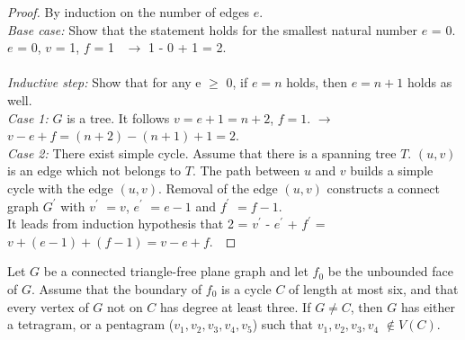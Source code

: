 \begin{proof}
By induction on the number of edges $e$.\\
\textit{Base case: } Show that the statement holds for the smallest natural number $e$ = 0.\\
$e$ = 0, $v$ = 1, $f$ = 1 \ $\xrightarrow{}$ 1 - 0 + 1 = 2. \\
\\
\textit{Inductive step: }Show that for any e $\geq$ 0, if $e = n$ holds, then $e = n + 1$ holds as well. \\
\textit{Case 1: }$G$ is a tree. It follows $v = e + 1 = n + 2$, $f = 1$. $\longrightarrow$ $v - e + f = (n + 2) - (n+1) + 1 = 2$.\\
\textit{Case 2: }There exist simple cycle. Assume that there is a spanning tree $T$. $(u, v)$ is an edge which not belongs to $T$. The path between $u$ and $v$ builds a simple cycle with the edge $(u, v)$. Removal of the edge $(u, v)$ constructs a connect graph $G^{'}$ with $v^{'}$ $ = v$, $e^{'}$ $=e - 1$ and $f^{'}$ $= f - 1$. \\
It leads from induction hypothesis that 2 = $v^{'}$ - $e^{'}$ + $f^{'}$ = $v + (e - 1) + (f - 1) = v - e + f$.\
\end{proof}

\begin{lemma}
Let $G$ be a connected triangle-free plane graph and let $f_0$ be the
unbounded face of $G$. Assume that the boundary of $f_0$ is a cycle $C$ of length
at most six, and that every vertex of $G$ not on $C$ has degree at least three. If
$G \ne C$, then $G$ has either a tetragram, or a pentagram ($v_1, v_2, v_3, v_4, v_5$) such
that $v_1, v_2, v_3, v_4$ $\notin V(C)$.\cite{dvorak2013threecoloring}
\end{lemma}

